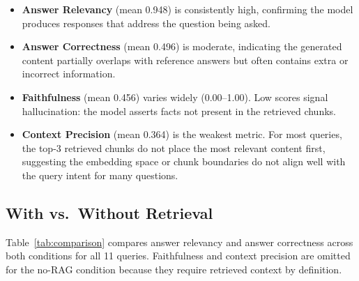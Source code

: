 \documentclass[11pt,a4paper]{article}
\begin{document}
\begin{itemize}
    \item \textbf{Answer Relevancy} (mean 0.948) is consistently high, confirming
          the model produces responses that address the question being asked.
    \item \textbf{Answer Correctness} (mean 0.496) is moderate, indicating the
          generated content partially overlaps with reference answers but often
          contains extra or incorrect information.
    \item \textbf{Faithfulness} (mean 0.456) varies widely (0.00--1.00).  Low
          scores signal hallucination: the model asserts facts not present in the
          retrieved chunks.
    \item \textbf{Context Precision} (mean 0.364) is the weakest metric.  For
          most queries, the top-3 retrieved chunks do not place the most relevant
          content first, suggesting the embedding space or chunk boundaries do not
          align well with the query intent for many questions.
\end{itemize}

\subsection{With vs.\ Without Retrieval}

Table~\ref{tab:comparison} compares answer relevancy and answer correctness across
both conditions for all 11 queries.  Faithfulness and context precision are omitted
for the no-RAG condition because they require retrieved context by definition.
\end{document}
